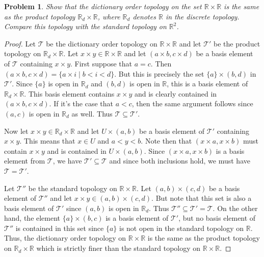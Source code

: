 \documentclass{article}
\newtheorem{problem}{Problem}
\begin{document}
\begin{problem}
Show that the dictionary order topology on the set $\mathbb{R} \times \mathbb{R}$ is the same as the product topology $\mathbb{R}_d \times \mathbb{R}$, where $\mathbb{R}_d$ denotes $\mathbb{R}$ in the discrete topology. Compare this topology with the standard topology on $\mathbb{R}^2$.
\end{problem}
\begin{proof}
Let $\mathcal{T}$ be the dictionary order topology on $\mathbb{R} \times \mathbb{R}$ and let $\mathcal{T}'$ be the product topology on $\mathbb{R}_d \times \mathbb{R}$. Let $x \times y \in \mathbb{R} \times \mathbb{R}$ and let $(a \times b, c \times d)$ be a basis element of $\mathcal{T}$ containing $x \times y$. First suppose that $a = c$. Then $(a \times b, c \times d) = \{a \times i \mid b < i < d\}$. But this is precisely the set $\{a\} \times (b,d)$ in $\mathcal{T}'$. Since $\{a\}$ is open in $\mathbb{R}_d$ and $(b,d)$ is open in $\mathbb{R}$, this is a basis element of $\mathbb{R}_d \times \mathbb{R}$. This basis element contains $x \times y$ and is clearly contained in $(a \times b, c \times d)$. If it's the case that $a < c$, then the same argument follows since $(a,c)$ is open in $\mathbb{R}_d$ as well. Thus $\mathcal{T} \subseteq \mathcal{T}'$.

Now let $x \times y \in \mathbb{R}_d \times \mathbb{R}$ and let $U \times (a,b)$ be a basis element of $\mathcal{T}'$ containing $x \times y$. This means that $x \in U$ and $a < y < b$. Note then that $(x \times a, x \times b)$ must contain $x \times y$ and is contained in $U \times (a,b)$. Since $(x \times a, x \times b)$ is a basis element from $\mathcal{T}$, we have $\mathcal{T}' \subseteq \mathcal{T}$ and since both inclusions hold, we must have $\mathcal{T} = \mathcal{T}'$.

Let $\mathcal{T}''$ be the standard topology on $\mathbb{R} \times \mathbb{R}$. Let $(a,b) \times (c,d)$ be a basis element of $\mathcal{T}''$ and let $x \times y \in (a,b) \times (c,d)$. But note that this set is also a basis element of $\mathcal{T}'$ since $(a,b)$ is open in $\mathbb{R}_d$. Thus $\mathcal{T}'' \subseteq \mathcal{T}' = \mathcal{T}$. On the other hand, the element $\{a\} \times (b,c)$ is a basis element of $\mathcal{T}'$, but no basis element of $\mathcal{T}''$ is contained in this set since $\{a\}$ is not open in the standard topology on $\mathbb{R}$. Thus, the dictionary order topology on $\mathbb{R} \times \mathbb{R}$ is the same as the product topology on $\mathbb{R}_d \times \mathbb{R}$ which is strictly finer than the standard topology on $\mathbb{R} \times \mathbb{R}$.
\end{proof}
\end{document}
